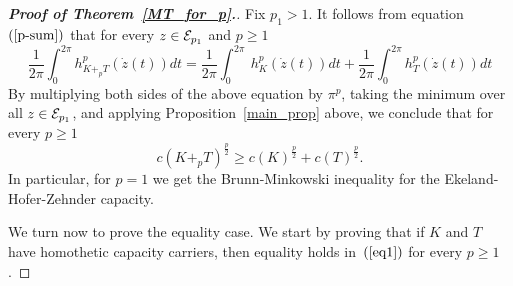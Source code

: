 \documentclass[12pt]{article}
\begin{document}
\begin{proof}[{\bf Proof of Theorem~\ref{MT_for_p}.}]
Fix $p_1 > 1$. It follows from equation~$(\ref{p-sum})$
that for every $z \in {\cal
E}_{p_1}$ and $p \geq 1$ \begin{equation}  \label{eq1-prf-of-MT}
{\frac 1 {2 \pi}}  \int_0^{ 2 \pi}
h^{p}_{K+_{p} T}(\dot{z}(t)) dt = {\frac 1 {2 \pi}}  \int_0^{2 \pi}
\ h^{p}_K(\dot{z}(t) )dt
+ {\frac 1 {2 \pi}}  \int_0^{2 \pi} h^{p}_T(\dot{z}(t))dt \end{equation}
%
By multiplying
both sides of the above equation by $\pi^{p}$,
taking the minimum over all $z \in {\cal E}_{p_1}$, %
and applying Proposition~\ref{main_prop} above, we conclude that for
every $p \geq 1$
\begin{equation} \label{eq1}  c (K+_{p} T)^{\frac {p} 2}
\geq c(K)^{\frac {p} 2} +  c(T)^{\frac  {p} 2}.
\end{equation}
In particular, for $p=1$ we get
the Brunn-Minkowski inequality for the Ekeland-Hofer-Zehnder capacity.

We turn now to prove the equality case. We start by proving that if
$K$ and $T$ have homothetic capacity carriers, then equality holds
in~$(\ref{eq1})$ for every $p\geq1$.


\end{proof}
\end{document}
